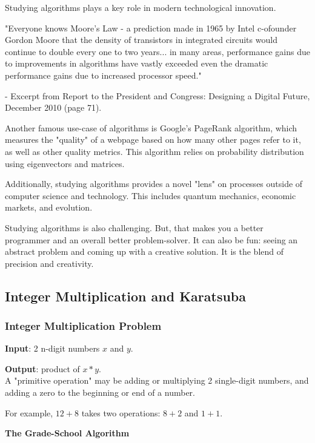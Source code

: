 \documentclass[11pt]{article}
\newenvironment{aside}
  {\begin{mdframed}[style=0,%
      leftline=false,rightline=false,leftmargin=2em,rightmargin=2em,%
          innerleftmargin=0pt,innerrightmargin=0pt,linewidth=0.75pt,%
      skipabove=7pt,skipbelow=7pt]\small}
  {\end{mdframed}}
\begin{document}
Studying algorithms plays a key role in modern technological innovation.
\vspace{11pt}
\begin{aside}
"Everyone knows Moore's Law - a prediction made in 1965 by Intel c-ofounder Gordon Moore that the density of transistors in integrated circuits would continue to double every one to two years... in many areas, performance gains due to improvements in algorithms have vastly exceeded even the dramatic performance gains due to increased processor speed."

- Excerpt from Report to the President and Congress: Designing a Digital Future, December 2010 (page 71).
\end{aside}
\vspace{11pt}
Another famous use-case of algorithms is Google's PageRank algorithm, which measures the "quality" of a webpage based on how many other pages refer to it, as well as other quality metrics. This algorithm relies on probability distribution using eigenvectors and matrices.

Additionally, studying algorithms provides a novel "lens" on processes outside of computer science and technology. This includes quantum mechanics, economic markets, and evolution.

Studying algorithms is also challenging. But, that makes you a better programmer and an overall better problem-solver. It can also be fun: seeing an abstract problem and coming up with a creative solution. It is the blend of precision and creativity.

\subsection{Integer Multiplication and Karatsuba}
\vspace{11pt}
\subsubsection{Integer Multiplication Problem}
\textbf{Input}: 2 n-digit numbers $x$ and $y$.

\textbf{Output}: product of $x * y$.
\vspace{11pt}
\\A "primitive operation" may be adding or multiplying 2 single-digit numbers, and adding a zero to the beginning or end of a number.

For example, $12 + 8$ takes two operations: $8 + 2$ and $1 + 1$.


\vspace{11pt}
\textbf{The Grade-School Algorithm}
\vspace{11pt}
\end{document}

